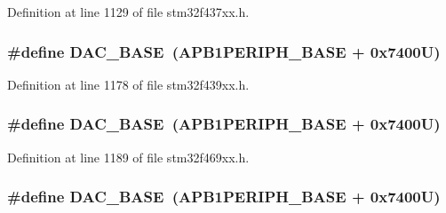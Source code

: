Definition at line 1129 of file stm32f437xx.\+h.

\subsubsection[{\texorpdfstring{D\+A\+C\+\_\+\+B\+A\+SE}{DAC_BASE}}]{\setlength{\rightskip}{0pt plus 5cm}\#define D\+A\+C\+\_\+\+B\+A\+SE~({\bf A\+P\+B1\+P\+E\+R\+I\+P\+H\+\_\+\+B\+A\+SE} + 0x7400\+U)}\hypertarget{group___peripheral__memory__map_gad18d0b914c7f68cecbee1a2d23a67d38}{}\label{group___peripheral__memory__map_gad18d0b914c7f68cecbee1a2d23a67d38}


Definition at line 1178 of file stm32f439xx.\+h.

\subsubsection[{\texorpdfstring{D\+A\+C\+\_\+\+B\+A\+SE}{DAC_BASE}}]{\setlength{\rightskip}{0pt plus 5cm}\#define D\+A\+C\+\_\+\+B\+A\+SE~({\bf A\+P\+B1\+P\+E\+R\+I\+P\+H\+\_\+\+B\+A\+SE} + 0x7400\+U)}\hypertarget{group___peripheral__memory__map_gad18d0b914c7f68cecbee1a2d23a67d38}{}\label{group___peripheral__memory__map_gad18d0b914c7f68cecbee1a2d23a67d38}


Definition at line 1189 of file stm32f469xx.\+h.

\subsubsection[{\texorpdfstring{D\+A\+C\+\_\+\+B\+A\+SE}{DAC_BASE}}]{\setlength{\rightskip}{0pt plus 5cm}\#define D\+A\+C\+\_\+\+B\+A\+SE~({\bf A\+P\+B1\+P\+E\+R\+I\+P\+H\+\_\+\+B\+A\+SE} + 0x7400\+U)}\hypertarget{group___peripheral__memory__map_gad18d0b914c7f68cecbee1a2d23a67d38}{}\label{group___peripheral__memory__map_gad18d0b914c7f68cecbee1a2d23a67d38}


